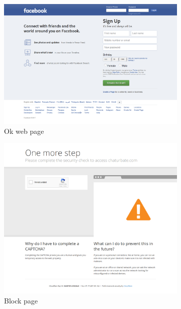 \documentclass{article} %
\begin{document}
\begin{figure}
    \centering
    \begin{subfigure}[b]{0.2\textwidth}
        \centering
        \includegraphics[width=\textwidth]{ok.png}
        \caption{Ok web page}
        \label{fig:okpage}
    \end{subfigure}
    \hfill
    \begin{subfigure}[b]{0.2\textwidth}
        \centering
        \includegraphics[width=\textwidth]{block.png}
        \caption{Block page}
        \label{fig:blockpage}
    \end{subfigure}
    \hfill
        \hfill
    \begin{subfigure}[b]{0.2\textwidth}

\end{subfigure}
\end{figure}
\end{document}
